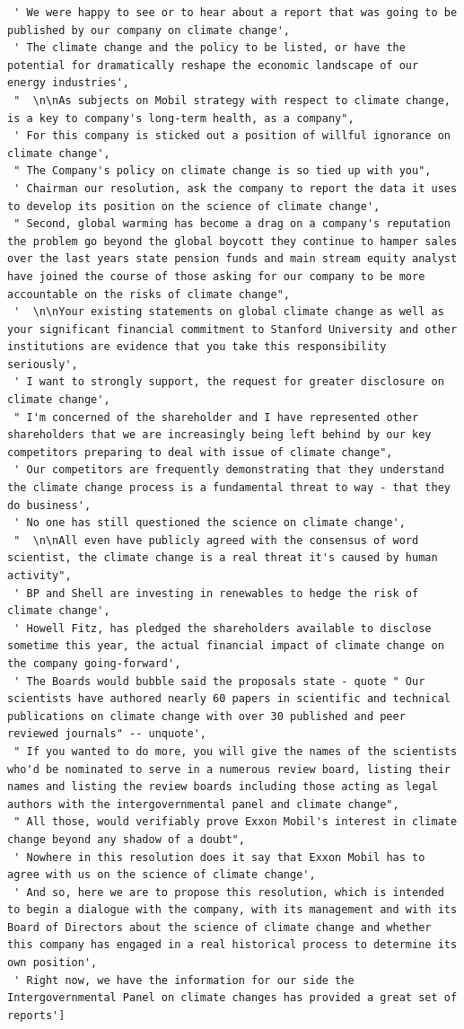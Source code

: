 \documentclass[
  letterpaper,
  DIV=11,
  numbers=noendperiod]{scrreprt}
\begin{document}
\begin{verbatim}
 ' We were happy to see or to hear about a report that was going to be published by our company on climate change',
 ' The climate change and the policy to be listed, or have the potential for dramatically reshape the economic landscape of our energy industries',
 "  \n\nAs subjects on Mobil strategy with respect to climate change, is a key to company's long-term health, as a company",
 ' For this company is sticked out a position of willful ignorance on climate change',
 " The Company's policy on climate change is so tied up with you",
 ' Chairman our resolution, ask the company to report the data it uses to develop its position on the science of climate change',
 " Second, global warming has become a drag on a company's reputation the problem go beyond the global boycott they continue to hamper sales over the last years state pension funds and main stream equity analyst have joined the course of those asking for our company to be more accountable on the risks of climate change",
 '  \n\nYour existing statements on global climate change as well as your significant financial commitment to Stanford University and other institutions are evidence that you take this responsibility seriously',
 ' I want to strongly support, the request for greater disclosure on climate change',
 " I'm concerned of the shareholder and I have represented other shareholders that we are increasingly being left behind by our key competitors preparing to deal with issue of climate change",
 ' Our competitors are frequently demonstrating that they understand the climate change process is a fundamental threat to way - that they do business',
 ' No one has still questioned the science on climate change',
 "  \n\nAll even have publicly agreed with the consensus of word scientist, the climate change is a real threat it's caused by human activity",
 ' BP and Shell are investing in renewables to hedge the risk of climate change',
 ' Howell Fitz, has pledged the shareholders available to disclose sometime this year, the actual financial impact of climate change on the company going-forward',
 ' The Boards would bubble said the proposals state - quote " Our scientists have authored nearly 60 papers in scientific and technical publications on climate change with over 30 published and peer reviewed journals" -- unquote',
 " If you wanted to do more, you will give the names of the scientists who'd be nominated to serve in a numerous review board, listing their names and listing the review boards including those acting as legal authors with the intergovernmental panel and climate change",
 " All those, would verifiably prove Exxon Mobil's interest in climate change beyond any shadow of a doubt",
 ' Nowhere in this resolution does it say that Exxon Mobil has to agree with us on the science of climate change',
 ' And so, here we are to propose this resolution, which is intended to begin a dialogue with the company, with its management and with its Board of Directors about the science of climate change and whether this company has engaged in a real historical process to determine its own position',
 ' Right now, we have the information for our side the Intergovernmental Panel on climate changes has provided a great set of reports']
\end{verbatim}
\end{document}
